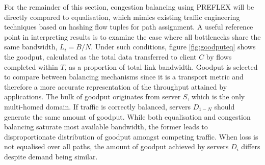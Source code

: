 For the remainder of this section, congestion balancing using \ac{PREFLEX} will be directly compared to equalisation, which mimics existing traffic engineering techniques based on hashing flow tuples for path assignment.
A useful reference point in interpreting results is to examine the case where all bottlenecks share the same bandwidth, $L_i=B/N$.
Under such conditions, figure \ref{fig:goodputeq} shows the goodput, calculated as the total data transferred to client $C$ by flows completed within $T$, as a proportion of total link bandwidth.
Goodput is selected to compare between balancing mechanisms since it is a transport metric and therefore a more accurate representation of the throughput attained by applications.
The bulk of goodput originates from server $S$, which is the only multi-homed domain.
If traffic is correctly balanced, servers $D_{1-N}$ should generate the same amount of goodput.
While both equalisation and congestion balancing saturate most available bandwidth, the former leads to disproportionate distribution of goodput amongst competing traffic. 
When loss is not equalised over all paths, the amount of goodput achieved by servers $D_i$ differs despite demand being similar.

